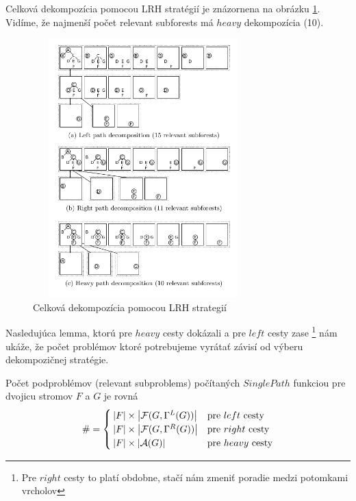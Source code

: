 Celková dekompozícia pomocou LRH stratégií je znázornena na obrázku \ref{obr:LRH_decomposition}.
Vidíme, že najmenší počet relevant subforests má $heavy$ dekompozícia (10).

\begin{figure}
\centering
\includegraphics[width=85mm, height=100mm]{../img/LRH_decomposition.png}
\caption{Celková dekompozícia pomocou LRH strategií }
\label{obr:LRH_decomposition}
\end{figure}

Nasledujúca lemma, ktorú pre $heavy$ cesty dokázali \citet{DMRW}
a pre $left$ cesty zase \citet{ZHANGSHASHA}
\footnote{Pre $right$ cesty to platí obdobne, stačí nám zmeniť poradie medzi potomkami vrcholov}
nám ukáže, že počet problémov ktoré potrebujeme vyrátať závisí od výberu dekompozičnej stratégie.

\begin{lemma}
  Počet podproblémov (relevant subproblems) počítaných $SinglePath$ funkciou pre dvojicu
  stromov $F$ a $G$ je rovná
  \begin{align*}
    \# = 
    \begin{cases}
      \left|{F}\right| \times \left|{\mathcal{F}(G, \Gamma^{L}(G))}\right| & \text{pre $left$ cesty}
      \\
      \left|{F}\right| \times \left|{\mathcal{F}(G, \Gamma^{R}(G))}\right| & \text{pre $right$ cesty}
      \\
      \left|{F}\right| \times \left|{\mathcal{A}(G)}\right| & \text{pre $heavy$ cesty}
    \end{cases}
  \end{align*}
\end{lemma}

